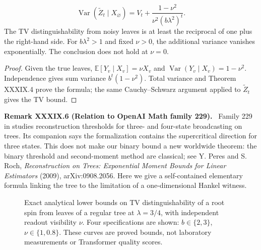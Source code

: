 \documentclass[11pt,a4paper,oneside]{book}
\newcommand{\statement}[3]{\par\medskip\noindent\textbf{#1 #2 (#3).}\ }
\begin{document}
\begin{equation}\operatorname{Var}(\widetilde Z_t\mid X_\varnothing)=V_t+\frac{1-\nu^2}{\nu^2(b\lambda^2)^t}.\tag{151}\end{equation}
The TV distinguishability from noisy leaves is at least the reciprocal of one plus the right-hand side. For $b\lambda^2>1$ and fixed $\nu>0$, the additional variance vanishes exponentially. The conclusion does not hold at $\nu=0$.
\begin{proof}
Given the true leaves, $\mathbb E[Y_v\mid X_v]=\nu X_v$ and $\operatorname{Var}(Y_v\mid X_v)=1-\nu^2$. Independence gives sum variance $b^t(1-\nu^2)$. Total variance and Theorem XXXIX.4 prove the formula; the same Cauchy--Schwarz argument applied to $\widetilde Z_t$ gives the TV bound.
\end{proof}
\statement{Remark}{XXXIX.6}{Relation to OpenAI Math family 229}
Family 229 in  studies reconstruction thresholds for three- and four-state broadcasting on trees. Its companion  says the formalization contains the supercritical direction for three states. This does not make our binary bound a new worldwide theorem: the binary threshold and second-moment method are classical; see Y. Peres and S. Roch, \emph{Reconstruction on Trees: Exponential Moment Bounds for Linear Estimators} (2009), arXiv:0908.2056. Here we give a self-contained elementary formula linking the tree to the limitation of a one-dimensional Hankel witness.
\begin{figure}[ht]\centering
{}
\caption{Exact analytical lower bounds on TV distinguishability of a root spin from leaves of a regular tree at $\lambda=3/4$, with independent readout visibility $\nu$. Four specifications are shown: $b\in\{2,3\}$, $\nu\in\{1,0.8\}$. These curves are proved bounds, not laboratory measurements or Transformer quality scores.}
\end{figure}
\end{document}
